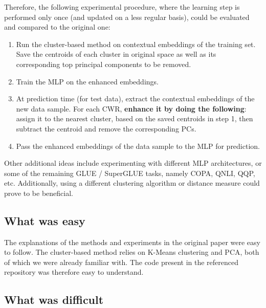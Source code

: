 Therefore, the following experimental procedure, where the learning step is performed only once (and updated on a less regular basis), could be evaluated and compared to the original one:
\begin{enumerate}
    \item Run the cluster-based method on contextual embeddings of the training set. Save the centroids of each cluster in original space as well as its corresponding top principal components to be removed.
    \item Train the MLP on the enhanced embeddings.
    \item At prediction time (for test data), extract the contextual embeddings of the new data sample. For each CWR, \textbf{enhance it by doing the following}: assign it to the nearest cluster, based on the saved centroids in step 1, then subtract the centroid and remove the corresponding PCs.
    \item Pass the enhanced embeddings of the data sample to the MLP for prediction.
\end{enumerate}

Other additional ideas include experimenting with different MLP architectures, or some of the remaining GLUE / SuperGLUE tasks, namely COPA, QNLI, QQP, etc. Additionally, using a different clustering algorithm or distance measure could prove to be beneficial. 

\subsection{What was easy}

The explanations of the methods and experiments in the original paper were easy to follow. The cluster-based method relies on K-Means clustering and PCA, both of which we were already familiar with. The code present in the referenced repository was therefore easy to understand. 



\subsection{What was difficult}
\label{sec:difficult}


